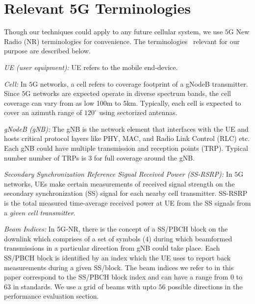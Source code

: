 \documentclass[conference, 10pt]{IEEEtran}
\begin{document}



\section{Relevant 5G Terminologies}
\label{sec:bg}
Though our techniques could apply to any future cellular system, we use $5$G New Radio (NR) 
terminologies for convenience. The terminologies~\cite{3gpp38series} relevant for our purpose are described below.

{\em UE (user equipment):} UE refers to the mobile end-device.

{\em Cell:} In $5$G networks, a cell refers to coverage footprint of a gNodeB transmitter. Since $5$G networks are expected operate in diverse spectrum bands, the cell coverage can vary from as low 100m to 5km. Typically, each cell is expected to cover an azimuth range of $120^\circ$ using sectorized antennas.

{\em gNodeB (gNB):} The gNB is the network element that interfaces with the UE and
hosts critical protocol layers like PHY, MAC, and Radio Link Control (RLC) etc. Each
gNB could have multiple transmission and reception points (TRP). Typical number number of TRPs is $3$ for full coverage around the gNB.

{\em Secondary Synchronization Reference Signal Received Power (SS-RSRP):} In $5$G networks, UEs make certain
measurements of received signal strength on the secondary synchronization (SS) signal for each nearby cell transmitter. SS-RSRP is
the total measured time-average received power at UE from the SS signals 
from a {\em given cell transmitter}. 

{\em Beam Indices:} In 5G-NR, there is the concept of a SS/PBCH block on the downlink which comprises of a set of symbols ($4$) during which beamformed transmissions in a particular direction from gNB could take place. Each SS/PBCH block is identified by an index which the UE uses to report back measurements during a given SS/block. The beam indices we refer to in this paper correspond to the SS/PBCH block index and can have a range from $0$ to $63$ in standards. We use a grid of beams with upto $56$ possible directions in the performance evaluation section.  



\end{document}
